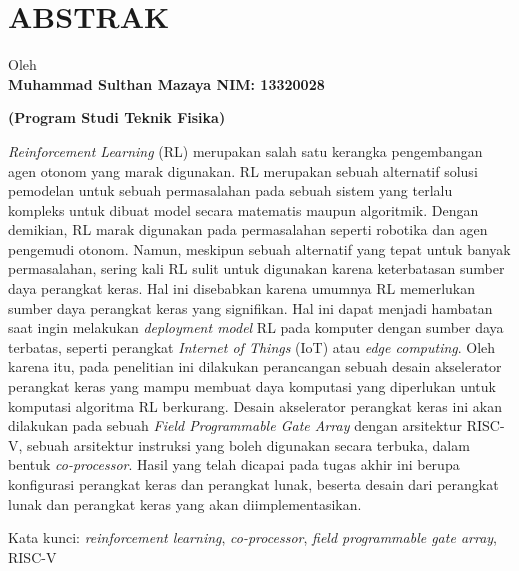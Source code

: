 \clearpage
\chapter*{ABSTRAK}

\begin{center}
	\begin{singlespace}
		\large\bfseries\MakeUppercase{\thetitle}
		
		\normalfont\normalsize
		
		Oleh\\
		\bfseries{Muhammad Sulthan Mazaya \hspace{5mm} NIM: 13320028}
		
		\vspace{5mm}
		\large\bfseries{(Program Studi Teknik Fisika)}
		\vspace{5mm}
		
	\end{singlespace}
\end{center}

\begin{singlespace}
	\small
	\textit{Reinforcement Learning} (RL) merupakan salah satu kerangka pengembangan agen
	otonom yang marak digunakan. RL merupakan sebuah alternatif solusi pemodelan
	untuk sebuah permasalahan pada sebuah sistem yang terlalu kompleks untuk dibuat
	model secara matematis maupun algoritmik. Dengan demikian, RL marak
	digunakan pada permasalahan seperti robotika dan agen pengemudi otonom.
	Namun, meskipun sebuah alternatif yang tepat untuk banyak permasalahan, sering
	kali RL sulit untuk digunakan karena keterbatasan sumber daya perangkat keras.
	Hal ini disebabkan karena umumnya RL memerlukan sumber daya perangkat keras
	yang signifikan. Hal ini dapat menjadi hambatan saat ingin melakukan \textit{deployment
		model} RL pada komputer dengan sumber daya terbatas, seperti perangkat \textit{Internet
		of Things} (IoT) atau \textit{edge computing}. Oleh karena itu, pada penelitian ini dilakukan
	perancangan sebuah desain akselerator perangkat keras yang mampu membuat
	daya komputasi yang diperlukan untuk komputasi algoritma RL berkurang. Desain
	akselerator perangkat keras ini akan dilakukan pada sebuah \textit{Field Programmable
		Gate Array} dengan arsitektur RISC-V, sebuah arsitektur instruksi yang boleh
	digunakan secara terbuka, dalam bentuk \textit{co-processor}. Hasil yang telah dicapai
	pada tugas akhir ini berupa konfigurasi perangkat keras dan perangkat lunak,
	beserta desain dari perangkat lunak dan perangkat keras yang akan
	diimplementasikan.
	
	Kata kunci: \textit{reinforcement learning}, \textit{co-processor}, \textit{field programmable gate array}, RISC-V
\end{singlespace}
\clearpage
